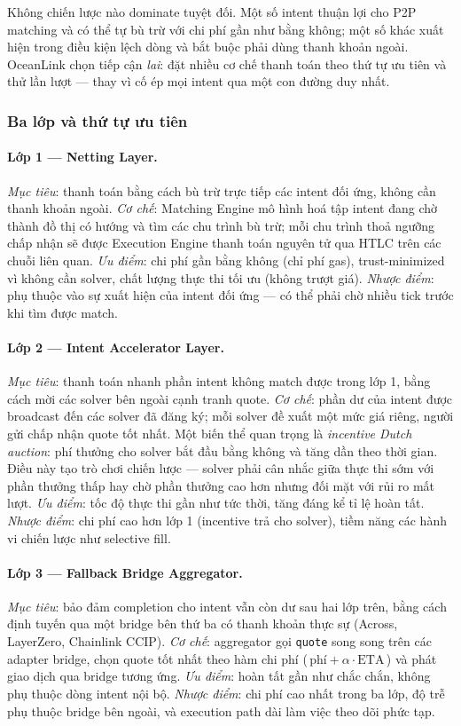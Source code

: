 Không chiến lược nào dominate tuyệt đối. Một số intent thuận lợi cho
P2P matching và có thể tự bù trừ với chi phí gần như bằng không;
một số khác xuất hiện trong điều kiện lệch dòng và bắt buộc phải
dùng thanh khoản ngoài. OceanLink chọn tiếp cận \emph{lai}: đặt
nhiều cơ chế thanh toán theo thứ tự ưu tiên và thử lần lượt — thay
vì cố ép mọi intent qua một con đường duy nhất.

\subsubsection*{Ba lớp và thứ tự ưu tiên}

\paragraph{Lớp 1 — Netting Layer.} \emph{Mục tiêu}: thanh toán bằng
cách bù trừ trực tiếp các intent đối ứng, không cần thanh khoản
ngoài. \emph{Cơ chế}: Matching Engine mô hình hoá tập intent đang
chờ thành đồ thị có hướng và tìm các chu trình bù trừ; mỗi chu trình
thoả ngưỡng chấp nhận sẽ được Execution Engine thanh toán nguyên tử
qua HTLC trên các chuỗi liên quan. \emph{Ưu điểm}: chi phí gần bằng
không (chỉ phí gas), trust-minimized vì không cần solver, chất lượng
thực thi tối ưu (không trượt giá). \emph{Nhược điểm}: phụ thuộc vào
sự xuất hiện của intent đối ứng — có thể phải chờ nhiều tick trước
khi tìm được match.

\paragraph{Lớp 2 — Intent Accelerator Layer.} \emph{Mục tiêu}: thanh
toán nhanh phần intent không match được trong lớp 1, bằng cách mời
các solver bên ngoài cạnh tranh quote. \emph{Cơ chế}: phần dư của
intent được broadcast đến các solver đã đăng ký; mỗi solver đề xuất
một mức giá riêng, người gửi chấp nhận quote tốt nhất. Một biến thể
quan trọng là \emph{incentive Dutch auction}: phí thưởng cho solver
bắt đầu bằng không và tăng dần theo thời gian. Điều này tạo trò chơi
chiến lược — solver phải cân nhắc giữa thực thi sớm với phần thưởng
thấp hay chờ phần thưởng cao hơn nhưng đối mặt với rủi ro mất lượt.
\emph{Ưu điểm}: tốc độ thực thi gần như tức thời, tăng đáng kể tỉ
lệ hoàn tất. \emph{Nhược điểm}: chi phí cao hơn lớp 1 (incentive
trả cho solver), tiềm năng các hành vi chiến lược như selective
fill.

\paragraph{Lớp 3 — Fallback Bridge Aggregator.} \emph{Mục tiêu}: bảo
đảm completion cho intent vẫn còn dư sau hai lớp trên, bằng cách
định tuyến qua một bridge bên thứ ba có thanh khoản thực sự (Across,
LayerZero, Chainlink CCIP). \emph{Cơ chế}: aggregator gọi
\texttt{quote} song song trên các adapter bridge, chọn quote tốt
nhất theo hàm chi phí (\,$\text{phí} + \alpha \cdot \text{ETA}$\,)
và phát giao dịch qua bridge tương ứng. \emph{Ưu điểm}: hoàn tất
gần như chắc chắn, không phụ thuộc dòng intent nội bộ.
\emph{Nhược điểm}: chi phí cao nhất trong ba lớp, độ trễ phụ thuộc
bridge bên ngoài, và execution path dài làm việc theo dõi phức tạp.

